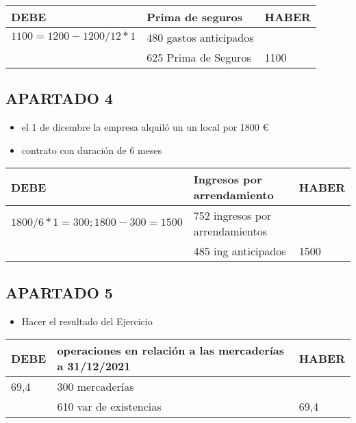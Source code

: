\documentclass[a4paper,12pt]{article}
\begin{document}
    \begin{table}[H]
        \centering
        \begin{tabular}{|p{3cm}|p{6cm}|p{3cm}|}
        \hline
        \textbf{DEBE} & \textbf{Prima de seguros} & \textbf{HABER} \\
        \hline
        $1100 = 1200 - 1200/12 * 1 $ & 480 gastos anticipados & \\
        \hline
        &625 Prima de Seguros & 1100 \\
        \hline
        
        \end{tabular}
        \end{table}
    
    \subsection*{APARTADO 4}
    \begin{itemize}
        \item el 1 de dicembre la empresa alquiló un un local por 1800 \euro
        \item contrato con duración de 6 meses
    \end{itemize}

    \begin{table}[H]
        \centering
        \begin{tabular}{|p{3cm}|p{6cm}|p{3cm}|}
        \hline
        \textbf{DEBE} & \textbf{Ingresos por arrendamiento} & \textbf{HABER} \\
        \hline
        $ 1800/6 * 1 = 300 ; 1800-300 = 1500 $ & 752 ingresos por arrendamientos & \\
        \hline
        & 485 ing anticipados & 1500 \\
        \hline
        
        \end{tabular}
        \end{table}

    \subsection*{APARTADO 5}
    \begin{itemize}
        \item Hacer el resultado del Ejercicio
    \end{itemize}

    \begin{table}[H]
        \centering
        \begin{tabular}{|p{3cm}|p{6cm}|p{3cm}|}
        \hline
        \textbf{DEBE} & \textbf{operaciones en relación a las mercaderías a 31/12/2021} & \textbf{HABER} \\
        \hline
        69,4 & 300 mercaderías& \\
        \hline
        & 610 var de existencias & 69,4\\
        \hline
        
        \end{tabular}
        \end{table}
\end{document}
